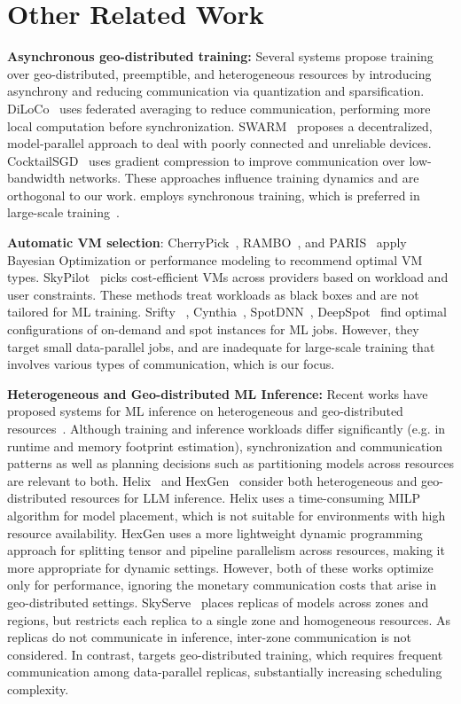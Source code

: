 \section{Other Related Work}

\textbf{Asynchronous geo-distributed training:} Several systems propose training over geo-distributed, preemptible, and heterogeneous resources by introducing asynchrony and reducing communication via quantization and sparsification. DiLoCo~\cite{douillard2024diloco} uses federated averaging to reduce communication, performing more local computation before synchronization. SWARM~\cite{ryabinin2023swarm}  proposes a decentralized, model-parallel approach to deal with poorly connected and unreliable devices. CocktailSGD~\cite{Wang23cocktailsgd} uses gradient compression to improve communication over low-bandwidth networks. These approaches influence training dynamics and are orthogonal to our work. \sailor employs synchronous training, which is preferred in large-scale training~\cite{wagenlander24tenplex}.


\textbf{Automatic VM selection}: CherryPick~\cite{Alipourfard17Cherrypick}, RAMBO~\cite{Li21Rambo}, and PARIS~\cite{Yadwadkar17Paris} apply Bayesian Optimization or performance modeling to recommend optimal VM types. SkyPilot~\cite{Zongheng23Skypilot} picks cost-efficient VMs across providers based on workload and user constraints. These methods treat workloads as black boxes and are not tailored for ML training. Srifty ~\cite{Luo22Srifty}, Cynthia~\cite{Zheng19Cynthia}, SpotDNN~\cite{Shang2023spotDNN}, DeepSpot~\cite{Lee17DeepSpotCloud} find optimal configurations of on-demand and spot instances for ML jobs. However, they target small data-parallel jobs, and are inadequate for large-scale training that involves various types of communication, which is our focus.

\textbf{Heterogeneous and Geo-distributed ML Inference:} Recent works have proposed systems for ML inference on heterogeneous and geo-distributed resources~\cite{Mei25Helix, Jian24Hexgen, Mao25Skyserve}. Although training and inference workloads differ significantly (e.g. in runtime and memory footprint estimation), synchronization and  communication patterns as well as planning decisions such as partitioning models across resources are relevant to both. Helix~\cite{Mei25Helix} and HexGen~\cite{Jian24Hexgen} consider both heterogeneous and geo-distributed resources for LLM inference. Helix uses a time-consuming MILP algorithm for model placement, which is not suitable for environments with high resource availability. HexGen uses a  more lightweight dynamic programming approach for splitting tensor and pipeline parallelism across resources, making it more appropriate for dynamic settings.
However, both of these works optimize only for performance, ignoring the monetary communication costs that arise in geo-distributed settings. SkyServe~\cite{Mao25Skyserve} places replicas of models across zones and regions, but restricts each replica to a single zone and homogeneous resources. As replicas do not communicate in inference, inter-zone communication is not considered. In contrast, \sailor targets geo-distributed training, which requires frequent communication among data-parallel replicas, substantially increasing scheduling complexity.
